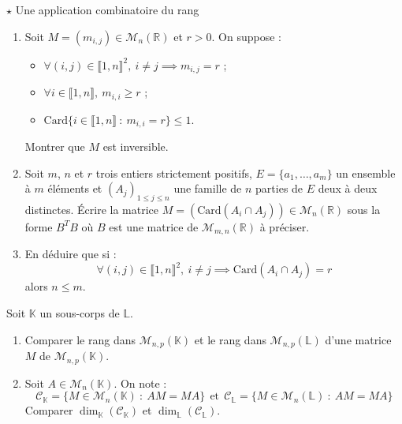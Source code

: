 \documentclass[french,a4paper]{article}
\newcommand{\R}{\mathbb{R}}
\newcommand{\K}{\mathbb{K}}
\renewcommand{\L}{\mathbb{L}}
\newcommand{\card}{\text{Card}}
\theoremstyle{plain}
\theoremstyle{definition}
\theoremstyle{remark}
\begin{document}
\begin{ex}{$\star$ Une application combinatoire du rang}
	\begin{enumerate}
		\item Soit $M=(m_{i,j})\in\mathcal{M}_n(\R)$ et $r>0$. On suppose :
		\begin{itemize}
			\item $\forall (i,j)\in\llbracket1,n\rrbracket^2,\ i\ne j\implies m_{i,j}=r$ ;
			\item $\forall i\in\llbracket1,n\rrbracket,\ m_{i,i}\geqslant r$ ;
			\item $\card\{i\in\llbracket1,n\rrbracket\ : \ m_{i,i}=r\}\leqslant 1$.
		\end{itemize} Montrer que $M$ est inversible.
		\item Soit $m$, $n$ et $r$ trois entiers strictement positifs, $E=\{a_1,\ldots,a_m\}$ un ensemble à $m$ éléments et $(A_j)_{1\leqslant j\leqslant n}$ une famille de $n$ parties de $E$ deux à deux distinctes. Écrire la matrice $M=(\card(A_i\cap A_j))\in\mathcal{M}_n(\R)$ sous la forme $B^TB$ où $B$ est une matrice de $\mathcal{M}_{m,n}(\R)$ à préciser.
		\item En déduire que si : $$\forall (i,j)\in\llbracket1,n\rrbracket^2,\ i\ne j\implies \card(A_i\cap A_j)=r$$ alors $n\leqslant m$.
	\end{enumerate}
\end{ex}

\begin{ex}{}
	Soit $\K$ un sous-corps de $\L$.
	\begin{enumerate}
		\item Comparer le rang dans $\mathcal{M}_{n,p}(\K)$ et le rang dans $\mathcal{M}_{n,p}(\L)$ d'une matrice $M$ de $\mathcal{M}_{n,p}(\K)$.
		\item Soit $A\in\mathcal{M}_n(\K)$. On note : $$\mathcal{C}_\K=\{M\in\mathcal{M}_n(\K)\ : \ AM=MA\}\ \ \text{et}\ \ \mathcal{C}_\L=\{M\in\mathcal{M}_n(\L)\ : \ AM=MA\}$$ Comparer $\dim_\K(\mathcal{C}_\K)$ et $\dim_\L(\mathcal{C}_\L)$.
	\end{enumerate}
\end{ex}
\end{document}
